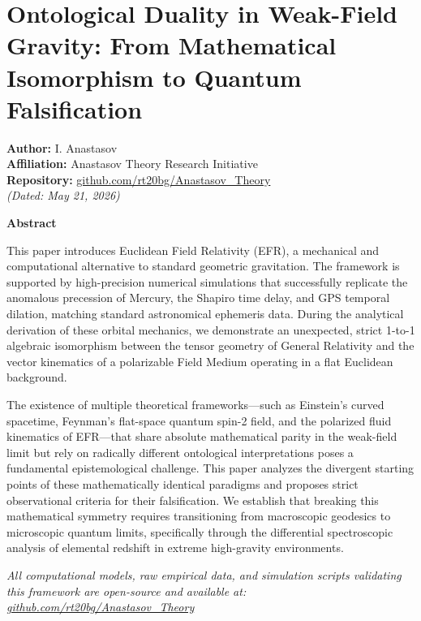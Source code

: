 \documentclass[
]{article}
\author{}
\date{}
\begin{document}
\section{Ontological Duality in Weak-Field Gravity: From Mathematical
Isomorphism to Quantum
Falsification}\label{ontological-duality-in-weak-field-gravity-from-mathematical-isomorphism-to-quantum-falsification}

\textbf{Author:} I. Anastasov\\
\textbf{Affiliation:} Anastasov Theory Research Initiative\\
\textbf{Repository:}
\href{https://github.com/rt20bg/Anastasov_Theory}{github.com/rt20bg/Anastasov\_Theory}\\
\emph{(Dated: May 21, 2026)}

\textbf{Abstract}

This paper introduces Euclidean Field Relativity (EFR), a mechanical and
computational alternative to standard geometric gravitation. The
framework is supported by high-precision numerical simulations that
successfully replicate the anomalous precession of Mercury, the Shapiro
time delay, and GPS temporal dilation, matching standard astronomical
ephemeris data. During the analytical derivation of these orbital
mechanics, we demonstrate an unexpected, strict 1-to-1 algebraic
isomorphism between the tensor geometry of General Relativity and the
vector kinematics of a polarizable Field Medium operating in a flat
Euclidean background.

The existence of multiple theoretical frameworks---such as Einstein's
curved spacetime, Feynman's flat-space quantum spin-2 field, and the
polarized fluid kinematics of EFR---that share absolute mathematical
parity in the weak-field limit but rely on radically different
ontological interpretations poses a fundamental epistemological
challenge. This paper analyzes the divergent starting points of these
mathematically identical paradigms and proposes strict observational
criteria for their falsification. We establish that breaking this
mathematical symmetry requires transitioning from macroscopic geodesics
to microscopic quantum limits, specifically through the differential
spectroscopic analysis of elemental redshift in extreme high-gravity
environments.

\emph{All computational models, raw empirical data, and simulation
scripts validating this framework are open-source and available at:
\href{https://github.com/rt20bg/Anastasov_Theory}{github.com/rt20bg/Anastasov\_Theory}}
\end{document}
